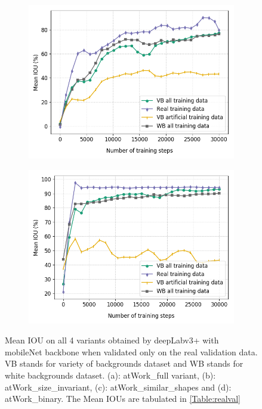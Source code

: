 \begin{figure}
\begin{subfigure}{.5\textwidth}
			\includegraphics[width=1\linewidth]{images/re_val_mob_shape}
			\caption{}
		\end{subfigure}
		\begin{subfigure}{.5\textwidth}
			\centering
			\includegraphics[width=1\linewidth]{images/re_val_mob_binary}
			\caption{}
		\end{subfigure}
		\caption{Mean IOU on all 4 variants obtained by deepLabv3+ with mobileNet backbone when validated only on the real validation data. VB stands for variety of backgrounds dataset and WB stands for white backgrounds dataset. (a): atWork\_full variant, (b): atWork\_size\_invariant, (c): atWork\_similar\_shapes and (d): atWork\_binary. The Mean IOUs are tabulated in \ref{Table:realval}}
		\label{Fig:realvalmob}
	\end{figure}

